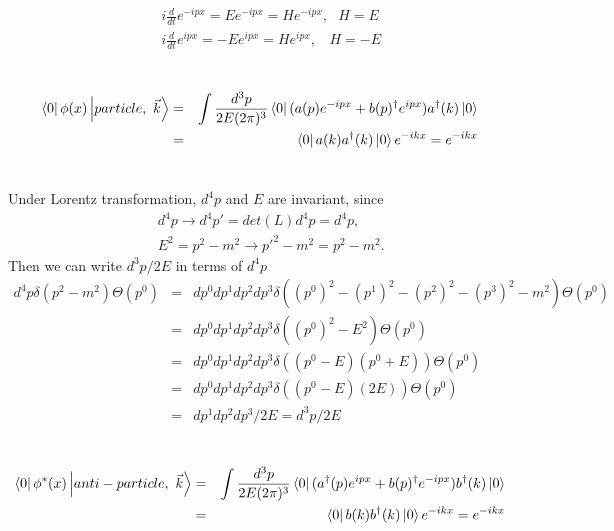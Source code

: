 \documentclass[11pt]{article}
\begin{document}
\section{ }
\begin{eqnarray}
    &&i\frac{d}{dt} e^{-ipx} = E e^{-ipx}=He^{-ipx},~~~H=E \\
    &&i\frac{d}{dt} e^{ipx} = -E e^{ipx}=He^{ipx},~~~~H=-E
\end{eqnarray}

\section{ }
\begin{eqnarray}
    \bra{0} \phi(x) \ket{particle,~{\vec k}}&=&   \int \frac{d^3p}{2E(2\pi)^3} \bra{0}(a(p) e^{-ipx} + b(p)^\dagger e^{ipx}) a^\dagger(k) \ket{0} \nonumber \\ &=& \bra{0}a(k)a^\dagger(k) \ket{0}e^{-ikx} =e^{-ikx}
\end{eqnarray}

\section{ }
Under Lorentz transformation, $d^4p$ and $E$ are invariant, since
\begin{eqnarray}
    &&d^4 p \to d^4 p' = det(L) d^4 p = d^4 p,\\
    &&E^2 =p^2 - m^2 \to p'^2 - m^2 = p^2 - m^2.
\end{eqnarray}
Then we can write $d^3p/2E$ in terms of $d^4p$
\begin{eqnarray}
    d^4 p \delta( p^2 - m^2 ) \Theta(p^0)
    &=&dp^0dp^1dp^2dp^3 \delta((p^0)^2-(p^1)^2-(p^2)^2-(p^3)^2-m^2) \Theta(p^0) \nonumber \\
    &=&dp^0dp^1dp^2dp^3 \delta( (p^0)^2 -E^2 ) \Theta(p^0) \nonumber\\
    &=&dp^0dp^1dp^2dp^3 \delta( (p^0-E) (p^0+E) ) \Theta(p^0)\nonumber\\
    &=&dp^0dp^1dp^2dp^3 \delta( (p^0-E) (2E) ) \Theta(p^0) \nonumber\\
    &=&    dp^1dp^2dp^3/2E
    =    d^3 p/2E 
\end{eqnarray}

\section{ }
\begin{eqnarray}
    \bra{0} \phi^*(x) \ket{anti-particle,~{\vec k}}&=&   \int \frac{d^3p}{2E(2\pi)^3} \bra{0}(a^\dagger (p) e^{ipx} + b(p)^\dagger e^{-ipx}) b^\dagger(k) \ket{0} \nonumber \\ &=& \bra{0}b(k)b^\dagger(k) \ket{0}e^{-ikx} =e^{-ikx}
\end{eqnarray}
\end{document}
